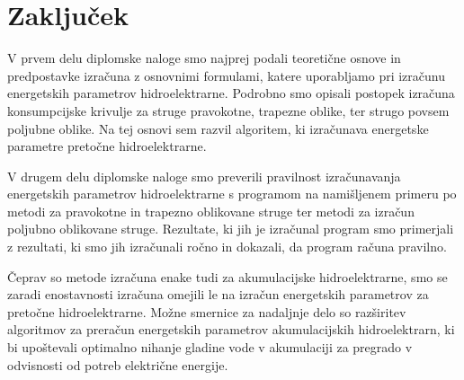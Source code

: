 
\chapter{Zaključek}

V prvem delu diplomske naloge smo najprej podali teoretične osnove in predpostavke izračuna z osnovnimi formulami, katere uporabljamo pri izračunu energetskih parametrov hidroelektrarne. Podrobno smo opisali postopek izračuna konsumpcijske krivulje za struge pravokotne, trapezne oblike, ter strugo povsem poljubne oblike. Na tej osnovi sem razvil algoritem, ki izračunava energetske parametre pretočne hidroelektrarne.


V drugem delu diplomske naloge smo preverili pravilnost izračunavanja energetskih parametrov hidroelektrarne s programom na namišljenem primeru po metodi za pravokotne in trapezno oblikovane struge ter metodi za izračun poljubno oblikovane struge. Rezultate, ki jih je izračunal program smo primerjali z rezultati, ki smo jih izračunali ročno in dokazali, da program računa pravilno.

 Čeprav so metode izračuna enake tudi za akumulacijske hidroelektrarne, smo se zaradi enostavnosti izračuna omejili le na izračun energetskih parametrov za pretočne hidroelektrarne. Možne smernice za nadaljnje delo so razširitev algoritmov za preračun energetskih parametrov akumulacijskih hidroelektrarn, ki bi upoštevali optimalno nihanje gladine vode v akumulaciji za pregrado v odvisnosti od potreb električne energije.



